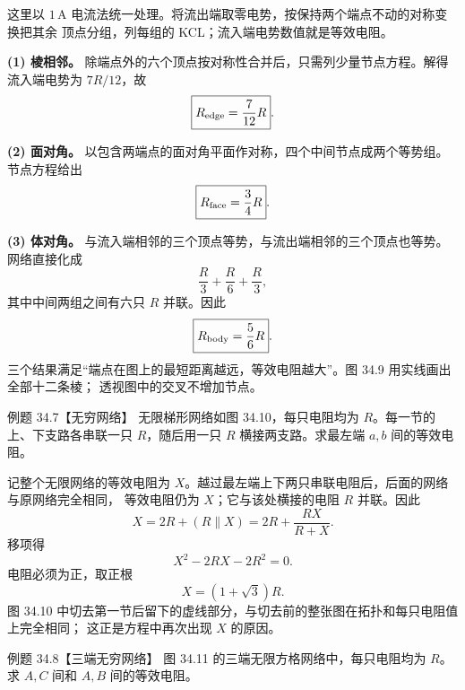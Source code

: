 \begin{xesolution}
这里以 $1\,\mathrm A$ 电流法统一处理。将流出端取零电势，按保持两个端点不动的对称变换把其余
顶点分组，列每组的 KCL；流入端电势数值就是等效电阻。

\textbf{(1) 棱相邻。}
除端点外的六个顶点按对称性合并后，只需列少量节点方程。解得流入端电势为
$7R/12$，故
\begin{equation}
  \boxed{R_{\rm edge}=\frac{7}{12}R}.
\end{equation}

\textbf{(2) 面对角。}
以包含两端点的面对角平面作对称，四个中间节点成两个等势组。节点方程给出
\begin{equation}
  \boxed{R_{\rm face}=\frac34R}.
\end{equation}

\textbf{(3) 体对角。}
与流入端相邻的三个顶点等势，与流出端相邻的三个顶点也等势。网络直接化成
\[
  \frac R3+\frac R6+\frac R3,
\]
其中中间两组之间有六只 $R$ 并联。因此
\begin{equation}
  \boxed{R_{\rm body}=\frac56R}.
\end{equation}
三个结果满足“端点在图上的最短距离越远，等效电阻越大”。图 34.9 用实线画出全部十二条棱；
透视图中的交叉不增加节点。

\cubeDiagram
\end{xesolution}

\Needspace{0.38\textheight}
\begin{origexamplebox}{例题 34.7【无穷网络】}
无限梯形网络如图 34.10，每只电阻均为 $R$。每一节的上、下支路各串联一只 $R$，随后用一只
$R$ 横接两支路。求最左端 $a,b$ 间的等效电阻。
\end{origexamplebox}

\begin{xesolution}
记整个无限网络的等效电阻为 $X$。越过最左端上下两只串联电阻后，后面的网络与原网络完全相同，
等效电阻仍为 $X$；它与该处横接的电阻 $R$ 并联。因此
\begin{equation}
  X=2R+(R\parallel X)=2R+\frac{RX}{R+X}.
\end{equation}
移项得
\[
  X^2-2RX-2R^2=0.
\]
电阻必须为正，取正根
\begin{equation}
  \boxed{X=(1+\sqrt3)R}.
\end{equation}
图 34.10 中切去第一节后留下的虚线部分，与切去前的整张图在拓扑和每只电阻值上完全相同；
这正是方程中再次出现 $X$ 的原因。

\ladderDiagram
\end{xesolution}

\Needspace{0.44\textheight}
\begin{origexamplebox}{例题 34.8【三端无穷网络】}
图 34.11 的三端无限方格网络中，每只电阻均为 $R$。求 $A,C$ 间和 $A,B$ 间的等效电阻。
\end{origexamplebox}

